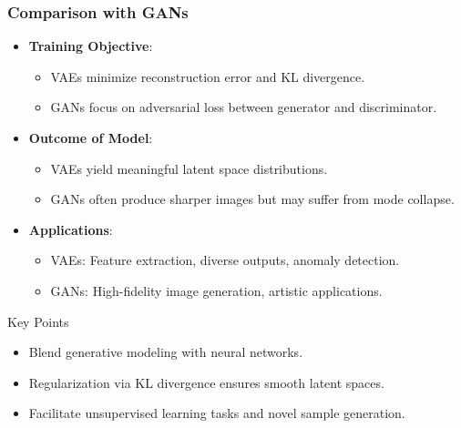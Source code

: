 \documentclass[aspectratio=169]{beamer}
\begin{document}
\begin{frame}[fragile]
    \frametitle{Comparison with GANs}
    \begin{itemize}
        \item \textbf{Training Objective}:
            \begin{itemize}
                \item VAEs minimize reconstruction error and KL divergence.
                \item GANs focus on adversarial loss between generator and discriminator.
            \end{itemize}
        
        \item \textbf{Outcome of Model}:
            \begin{itemize}
                \item VAEs yield meaningful latent space distributions.
                \item GANs often produce sharper images but may suffer from mode collapse.
            \end{itemize}

        \item \textbf{Applications}:
            \begin{itemize}
                \item VAEs: Feature extraction, diverse outputs, anomaly detection.
                \item GANs: High-fidelity image generation, artistic applications.
            \end{itemize}
    \end{itemize}
    
    \begin{block}{Key Points}
        \begin{itemize}
            \item Blend generative modeling with neural networks.
            \item Regularization via KL divergence ensures smooth latent spaces.
            \item Facilitate unsupervised learning tasks and novel sample generation.
        \end{itemize}
    \end{block}
\end{frame}
\end{document}
